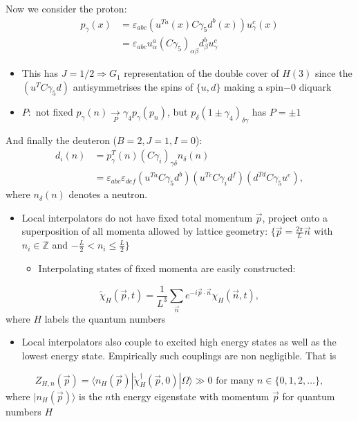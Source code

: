 Now we consider the proton:
\begin{align}
    p_\gamma(x) &= \varepsilon_{abc}(u^{Ta}(x)C\gamma_5 d^b(x)) u^c_\gamma(x) \nonumber \\
    &= \varepsilon_{abc} u_\alpha^a (C \gamma_5)_{\alpha \beta} d_\beta^b u_\gamma^c
\end{align}
\begin{itemize}
    \item This has $J = 1/2 \Rightarrow G_1$ representation of the double cover of $H(3)$ since the $(u^T C \gamma_5 d)$ antisymmetrises the spins of $\{u,d\}$ making a spin$-0$ diquark
    \item $P:$ not fixed $p_\gamma(n) \underset{P}{\rightarrow} \gamma_4 p_\gamma(p_n)$, but $p_\delta (1 \pm \gamma_4)_{\delta \gamma}$ has $P = \pm 1$
\end{itemize}
And finally the deuteron ($B=2, J=1, I=0$):
\begin{align}
    d_i(n) &= p_\gamma^T(n) (C {\gamma_i})_{\gamma \delta} n_\delta(n) \nonumber \\
    &= \varepsilon_{abc} \varepsilon_{def} (u^{T a} C \gamma_5 d^b) (u^{T c} C \gamma_i d^f) (d^{T d} C \gamma_5 u^e),
\end{align}
where $n_\delta(n)$ denotes a neutron.
\begin{itemize}
    \item Local interpolators do not have fixed total momentum $\vec{p}$, project onto a superposition of all momenta allowed by lattice geometry: $\{\vec{p} = \frac{2 \pi}{L} \vec{n}$ with $n_i \in \mathbb{Z}$ and $-\frac{L}{2} < n_i \leq \frac{L}{2}\}$
    \begin{itemize}
        \item Interpolating states of fixed momenta are easily constructed:
    \end{itemize}
\end{itemize}
\begin{equation}
    \tilde{\chi}_H(\vec{p}, t) = \frac{1}{L^3} \sum_{\vec{n}} e^{-i \vec{p} \cdot \vec{n}} \chi_H(\vec{n}, t),
\end{equation}
where $H$ labels the quantum numbers
\begin{itemize}
    \item Local interpolators also couple to excited high energy states as well as the lowest energy state. Empirically such couplings are non negligible. That is
\end{itemize}
\begin{equation}
    Z_{H, n}(\vec{p}) = \langle n_H(\vec{p})|\tilde{\chi}_H^\dagger(\vec{p},0) | \Omega \rangle \gg 0 \text{ for many } n \in \{0,1,2,\ldots\},
\end{equation}
where $|n_H(\vec{p})\rangle$ is the $n$th energy eigenstate with momentum $\vec{p}$ for quantum numbers $H$

